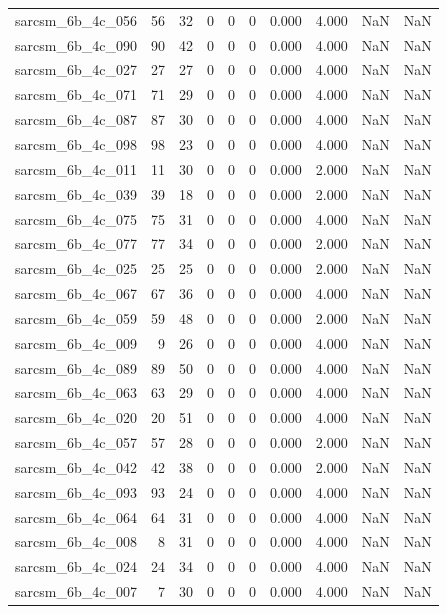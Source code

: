 \documentclass{article}
\begin{document}
\begin{longtable}{lrrrrrrrrr}
sarcsm\_6b\_4c\_056 & 56 & 32 & 0 & 0 & 0 & 0.000 & 4.000 & NaN & NaN \\
sarcsm\_6b\_4c\_090 & 90 & 42 & 0 & 0 & 0 & 0.000 & 4.000 & NaN & NaN \\
sarcsm\_6b\_4c\_027 & 27 & 27 & 0 & 0 & 0 & 0.000 & 4.000 & NaN & NaN \\
sarcsm\_6b\_4c\_071 & 71 & 29 & 0 & 0 & 0 & 0.000 & 4.000 & NaN & NaN \\
sarcsm\_6b\_4c\_087 & 87 & 30 & 0 & 0 & 0 & 0.000 & 4.000 & NaN & NaN \\
sarcsm\_6b\_4c\_098 & 98 & 23 & 0 & 0 & 0 & 0.000 & 4.000 & NaN & NaN \\
sarcsm\_6b\_4c\_011 & 11 & 30 & 0 & 0 & 0 & 0.000 & 2.000 & NaN & NaN \\
sarcsm\_6b\_4c\_039 & 39 & 18 & 0 & 0 & 0 & 0.000 & 2.000 & NaN & NaN \\
sarcsm\_6b\_4c\_075 & 75 & 31 & 0 & 0 & 0 & 0.000 & 4.000 & NaN & NaN \\
sarcsm\_6b\_4c\_077 & 77 & 34 & 0 & 0 & 0 & 0.000 & 2.000 & NaN & NaN \\
sarcsm\_6b\_4c\_025 & 25 & 25 & 0 & 0 & 0 & 0.000 & 2.000 & NaN & NaN \\
sarcsm\_6b\_4c\_067 & 67 & 36 & 0 & 0 & 0 & 0.000 & 4.000 & NaN & NaN \\
sarcsm\_6b\_4c\_059 & 59 & 48 & 0 & 0 & 0 & 0.000 & 2.000 & NaN & NaN \\
sarcsm\_6b\_4c\_009 & 9 & 26 & 0 & 0 & 0 & 0.000 & 4.000 & NaN & NaN \\
sarcsm\_6b\_4c\_089 & 89 & 50 & 0 & 0 & 0 & 0.000 & 4.000 & NaN & NaN \\
sarcsm\_6b\_4c\_063 & 63 & 29 & 0 & 0 & 0 & 0.000 & 4.000 & NaN & NaN \\
sarcsm\_6b\_4c\_020 & 20 & 51 & 0 & 0 & 0 & 0.000 & 4.000 & NaN & NaN \\
sarcsm\_6b\_4c\_057 & 57 & 28 & 0 & 0 & 0 & 0.000 & 2.000 & NaN & NaN \\
sarcsm\_6b\_4c\_042 & 42 & 38 & 0 & 0 & 0 & 0.000 & 2.000 & NaN & NaN \\
sarcsm\_6b\_4c\_093 & 93 & 24 & 0 & 0 & 0 & 0.000 & 4.000 & NaN & NaN \\
sarcsm\_6b\_4c\_064 & 64 & 31 & 0 & 0 & 0 & 0.000 & 4.000 & NaN & NaN \\
sarcsm\_6b\_4c\_008 & 8 & 31 & 0 & 0 & 0 & 0.000 & 4.000 & NaN & NaN \\
sarcsm\_6b\_4c\_024 & 24 & 34 & 0 & 0 & 0 & 0.000 & 4.000 & NaN & NaN \\
sarcsm\_6b\_4c\_007 & 7 & 30 & 0 & 0 & 0 & 0.000 & 4.000 & NaN & NaN \\

\end{longtable}
\end{document}
